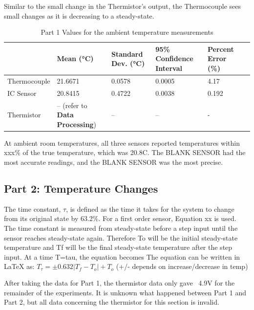 \documentclass{article}
\begin{document}
Similar to the small change in the Thermistor's output, the Thermocouple sees small changes as it is decreasing to a steady-state. 


\begin{table}[hbtp]
    \centering
    \begin{tabularx}{\textwidth}{|X|X|X|X|X|X|}
        \hline
        & Mean (°C) & Standard Dev. (°C) & 95\% Confidence Interval & Percent Error (\%) \\
        \hline
        Thermocouple & 21.6671 & 0.0578 & 0.0005 & 4.17 \\
        \hline
        IC Sensor & 20.8415 & 0.4722 & 0.0038  & 0.192\\
        \hline
        Thermistor & -- (refer to \textbf{Data Processing}) & -- & -- & - \\
        \hline
    \end{tabularx}
    \caption{Part 1 Values for the ambient temperature measurements}
    \label{tab:Ambient_temp_stats}
\end{table}

At ambient room temperatures, all three sensors reported temperatures within xxx\% of the true temperature, which was 20.8\degree C.  The BLANK SENSOR had the most accurate readings, and the BLANK SENSOR was the most precise.  

\subsection{Part 2: Temperature Changes}

The time constant, \(\tau\),  is defined as the time it takes for the system to change from its original state by 63.2\%.  For a first order sensor, Equation xx is used.  The time constant is measured from steady-state before a step input until the sensor reaches steady-state again.  Therefore To will be the initial steady-state temperature and Tf will be the final steady-state temperature after the step input. 
At a time T=tau, the equation becomes The equation can be written in LaTeX as: \( T_{\tau} = \pm 0.632|T_f - T_o| + T_o \) (+/- depends on increase/decrease in temp) 

After taking the data for Part 1, the thermistor data only gave ~4.9V for the remainder of the experiments.  It is unknown what happened between Part 1 and Part 2, but all data concerning the thermistor for this section is invalid.  
\end{document}
